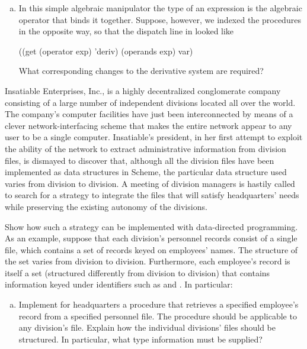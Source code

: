 \begin{exerciseGroup}
\begin{enumerate}[a.]
\item
In this simple algebraic manipulator the type of an expression is the algebraic
operator that binds it together.  Suppose, however, we indexed the procedures
in the opposite way, so that the dispatch line in  looked like

\begin{codeBlock}
((get (operator exp) 'deriv) (operands exp) var)
\end{codeBlock}

\noindent
What corresponding changes to the derivative system are required?

\end{enumerate}

\label{Exercise 2.74}
 Insatiable Enterprises, Inc., is
a highly decentralized conglomerate company consisting of a large number of
independent divisions located all over the world.  The company's computer
facilities have just been interconnected by means of a clever
network-interfacing scheme that makes the entire network appear to any user to
be a single computer.  Insatiable's president, in her first attempt to exploit
the ability of the network to extract administrative information from division
files, is dismayed to discover that, although all the division files have been
implemented as data structures in Scheme, the particular data structure used
varies from division to division.  A meeting of division managers is hastily
called to search for a strategy to integrate the files that will satisfy
headquarters' needs while preserving the existing autonomy of the divisions.

Show how such a strategy can be implemented with data-directed programming.  As
an example, suppose that each division's personnel records consist of a single
file, which contains a set of records keyed on employees' names.  The structure
of the set varies from division to division.  Furthermore, each employee's
record is itself a set (structured differently from division to division) that
contains information keyed under identifiers such as  and
.  In particular:

\begin{enumerate}[a.]

\item
Implement for headquarters a  procedure that retrieves a
specified employee's record from a specified personnel file.  The procedure
should be applicable to any division's file.  Explain how the individual
divisions' files should be structured.  In particular, what type information
must be supplied?


\end{enumerate}
\end{exerciseGroup}
